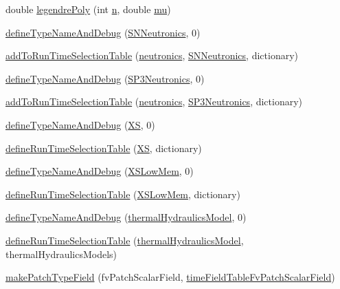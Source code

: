 \begin{DoxyCompactItemize}
\item 
double \hyperlink{namespaceFoam_a09d3256445918e0d39ba72953ec62dfe}{legendre\+Poly} (int \hyperlink{solvePointKinetics_8H_adb283ac99a91b10be7420fca0134b932}{n}, double \hyperlink{EEqns__2p_8H_a5f502f41f7fa5ac3329b38810d2514f6}{mu})
\item 
\hyperlink{namespaceFoam_a12823a4ed644888f68c56b8590a785b0}{define\+Type\+Name\+And\+Debug} (\hyperlink{classFoam_1_1SNNeutronics}{S\+N\+Neutronics}, 0)
\item 
\hyperlink{namespaceFoam_abeb542e06916a7eebdd3701cf9207b85}{add\+To\+Run\+Time\+Selection\+Table} (\hyperlink{classFoam_1_1neutronics}{neutronics}, \hyperlink{classFoam_1_1SNNeutronics}{S\+N\+Neutronics}, dictionary)
\item 
\hyperlink{namespaceFoam_a707e158d8efe7f6744d0d4c998ae9d3f}{define\+Type\+Name\+And\+Debug} (\hyperlink{classFoam_1_1SP3Neutronics}{S\+P3\+Neutronics}, 0)
\item 
\hyperlink{namespaceFoam_a9ddaf5f5b600f2d89285320c786421c1}{add\+To\+Run\+Time\+Selection\+Table} (\hyperlink{classFoam_1_1neutronics}{neutronics}, \hyperlink{classFoam_1_1SP3Neutronics}{S\+P3\+Neutronics}, dictionary)
\item 
\hyperlink{namespaceFoam_a01946a4582cce18991f360bd99eb3c0e}{define\+Type\+Name\+And\+Debug} (\hyperlink{classFoam_1_1XS}{XS}, 0)
\item 
\hyperlink{namespaceFoam_a29d6699b3aa5d34b025438beedb13666}{define\+Run\+Time\+Selection\+Table} (\hyperlink{classFoam_1_1XS}{XS}, dictionary)
\item 
\hyperlink{namespaceFoam_a1059662014a137b1778293e8ce7dac7a}{define\+Type\+Name\+And\+Debug} (\hyperlink{classFoam_1_1XSLowMem}{X\+S\+Low\+Mem}, 0)
\item 
\hyperlink{namespaceFoam_aac220b65e5725120375836ad2c84fec5}{define\+Run\+Time\+Selection\+Table} (\hyperlink{classFoam_1_1XSLowMem}{X\+S\+Low\+Mem}, dictionary)
\item 
\hyperlink{namespaceFoam_ada2ef2212999a3b0fcf20c4c6e99e556}{define\+Type\+Name\+And\+Debug} (\hyperlink{classFoam_1_1thermalHydraulicsModel}{thermal\+Hydraulics\+Model}, 0)
\item 
\hyperlink{namespaceFoam_a96db316811bbced71b7d20ace04527bf}{define\+Run\+Time\+Selection\+Table} (\hyperlink{classFoam_1_1thermalHydraulicsModel}{thermal\+Hydraulics\+Model}, thermal\+Hydraulics\+Models)
\item 
\hyperlink{namespaceFoam_a50b7735facab68b5459bf331fd593b98}{make\+Patch\+Type\+Field} (fv\+Patch\+Scalar\+Field, \hyperlink{classFoam_1_1timeFieldTableFvPatchScalarField}{time\+Field\+Table\+Fv\+Patch\+Scalar\+Field})

\end{DoxyCompactItemize}
